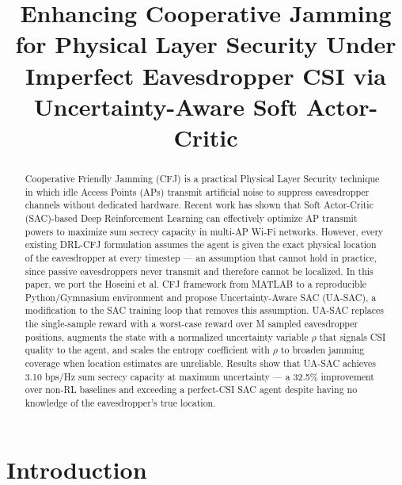 \documentclass[conference]{IEEEtran}
\begin{document}
\title{Enhancing Cooperative Jamming for Physical Layer Security Under Imperfect Eavesdropper CSI via Uncertainty-Aware Soft Actor-Critic}

\author{
}

\maketitle

\begin{abstract}
Cooperative Friendly Jamming (CFJ) is a practical Physical Layer Security technique in which idle Access Points (APs) transmit artificial noise to suppress eavesdropper channels without dedicated hardware. Recent work has shown that Soft Actor-Critic (SAC)-based Deep Reinforcement Learning can effectively optimize AP transmit powers to maximize sum secrecy capacity in multi-AP Wi-Fi networks. However, every existing DRL-CFJ formulation assumes the agent is given the exact physical location of the eavesdropper at every timestep --- an assumption that cannot hold in practice, since passive eavesdroppers never transmit and therefore cannot be localized. In this paper, we port the Hoseini et al. CFJ framework from MATLAB to a reproducible Python/Gymnasium environment and propose Uncertainty-Aware SAC (UA-SAC), a modification to the SAC training loop that removes this assumption. UA-SAC replaces the single-sample reward with a worst-case reward over M sampled eavesdropper positions, augments the state with a normalized uncertainty variable $\rho$ that signals CSI quality to the agent, and scales the entropy coefficient with $\rho$ to broaden jamming coverage when location estimates are unreliable. Results show that UA-SAC achieves 3.10 bps/Hz sum secrecy capacity at maximum uncertainty --- a 32.5\% improvement over non-RL baselines and exceeding a perfect-CSI SAC agent despite having no knowledge of the eavesdropper's true location.
\end{abstract}

\section{Introduction}
\end{document}

